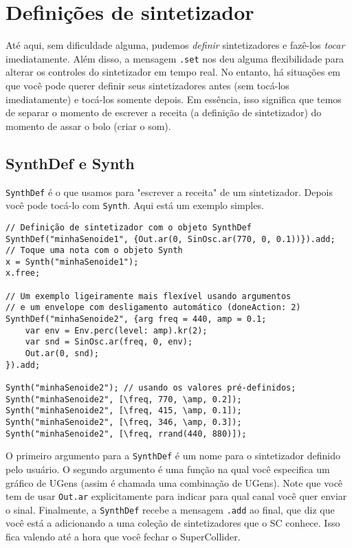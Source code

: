 \section{Definições de sintetizador}
\label{sec:synthdef}

Até aqui, sem dificuldade alguma, pudemos \emph{definir} sintetizadores e fazê-los \emph{tocar} imediatamente. Além disso, a mensagem \texttt{.set} nos deu alguma flexibilidade para alterar os controles do sintetizador em tempo real. No entanto, há situações em que você pode querer definir seus sintetizadores antes (sem tocá-los imediatamente) e tocá-los somente depois. Em essência, isso significa que temos de separar o momento de escrever a receita (a definição de sintetizador) do momento de assar o bolo (criar o som).


\subsection{SynthDef e Synth}

\texttt{SynthDef} é o que usamos para "escrever a receita" de um sintetizador. Depois você pode tocá-lo com \texttt{Synth}. Aqui está um exemplo simples.

\begin{lstlisting}[style=SuperCollider-IDE, basicstyle=\scttfamily\footnotesize]
// Definição de sintetizador com o objeto SynthDef
SynthDef("minhaSenoide1", {Out.ar(0, SinOsc.ar(770, 0, 0.1))}).add;
// Toque uma nota com o objeto Synth
x = Synth("minhaSenoide1");
x.free;

// Um exemplo ligeiramente mais flexível usando argumentos
// e um envelope com desligamento automático (doneAction: 2)
SynthDef("minhaSenoide2", {arg freq = 440, amp = 0.1; 
	var env = Env.perc(level: amp).kr(2);
	var snd = SinOsc.ar(freq, 0, env);
	Out.ar(0, snd);
}).add;

Synth("minhaSenoide2"); // usando os valores pré-definidos;
Synth("minhaSenoide2", [\freq, 770, \amp, 0.2]);
Synth("minhaSenoide2", [\freq, 415, \amp, 0.1]);
Synth("minhaSenoide2", [\freq, 346, \amp, 0.3]);
Synth("minhaSenoide2", [\freq, rrand(440, 880)]);
\end{lstlisting}

O primeiro argumento para a \texttt{SynthDef} é um nome para o sintetizador definido pelo usuário. O segundo argumento é uma função na qual você especifica um gráfico de UGens (assim é chamada uma combinação de UGens). Note que você tem de usar \texttt{Out.ar} explicitamente para indicar para qual canal você quer enviar o sinal. Finalmente, a \texttt{SynthDef} recebe a mensagem  \texttt{.add} ao final, que diz que você está a adicionando a uma coleção de sintetizadores que o SC conhece. Isso fica valendo até a hora que você fechar o SuperCollider.


